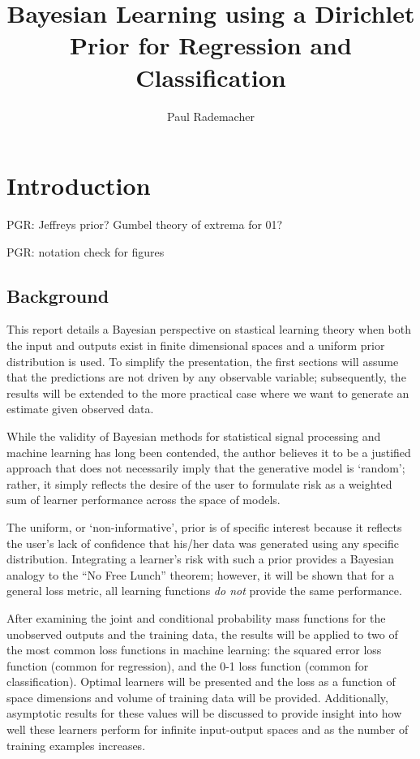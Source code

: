 \documentclass[12pt]{report}
\title{Bayesian Learning using a Dirichlet Prior for Regression and Classification}
\author{Paul Rademacher}
\begin{document}
\maketitle
\tableofcontents

\chapter{Introduction}

PGR: Jeffreys prior? Gumbel theory of extrema for 01?

PGR: notation check for figures


\section{Background}

This report details a Bayesian perspective on stastical learning theory when both the input and outputs exist in finite dimensional spaces and a uniform prior distribution is used. To simplify the presentation, the first sections will assume that the predictions are not driven by any observable variable; subsequently, the results will be extended to the more practical case where we want to generate an estimate given observed data.

While the validity of Bayesian methods for statistical signal processing and machine learning has long been contended, the author believes it to be a justified approach that does not necessarily imply that the generative model is `random'; rather, it simply reflects the desire of the user to formulate risk as a weighted sum of learner performance across the space of models. 

The uniform, or `non-informative', prior is of specific interest because it reflects the user's lack of confidence that his/her data was generated using any specific distribution. Integrating a learner's risk with such a prior provides a Bayesian analogy to the ``No Free Lunch'' theorem; however, it will be shown that for a general loss metric, all learning functions \emph{do not} provide the same performance.

After examining the joint and conditional probability mass functions for the unobserved outputs and the training data, the results will be applied to two of the most common loss functions in machine learning: the squared error loss function (common for regression), and the 0-1 loss function (common for classification). Optimal learners will be presented and the loss as a function of space dimensions and volume of training data will be provided. Additionally, asymptotic results for these values will be discussed to provide insight into how well these learners perform for infinite input-output spaces and as the number of training examples increases. 
\end{document}
